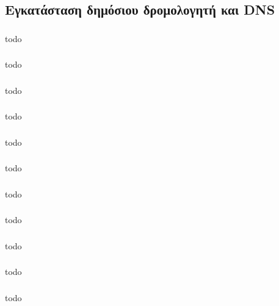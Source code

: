 \documentclass[a4paper, 12pt]{article}
\begin{document}
	\subsection{Εγκατάσταση δημόσιου δρομολογητή και DNS}

		\subsubsection{}
			todo

		\subsubsection{}
			todo

		\subsubsection{}
			todo

		\subsubsection{}
			todo

		\subsubsection{}
			todo

		\subsubsection{}
			todo

		\subsubsection{}
			todo

		\subsubsection{}
			todo

		\subsubsection{}
			todo

		\subsubsection{}
			todo

		\subsubsection{}
			todo
\end{document}
